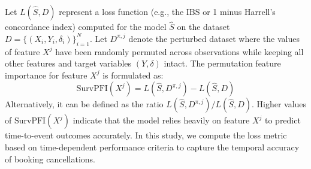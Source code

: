 \documentclass[pdflatex,sn-mathphys-ay]{sn-jnl}%
\theoremstyle{thmstyleone}%
\theoremstyle{thmstyletwo}%
\theoremstyle{thmstylethree}%
\begin{document}
Let $L(\hat{S}, D)$ represent a loss function (e.g., the IBS or 1 minus Harrell's concordance index) computed for the model $\hat{S}$ on the dataset $D = \{(X_i, Y_i, \delta_i)\}_{i=1}^N$. Let $D^{\pi, j}$ denote the perturbed dataset where the values of feature $X^j$ have been randomly permuted across observations while keeping all other features and target variables $(Y, \delta)$ intact. The permutation feature importance for feature $X^j$ is formulated as:
\begin{equation}
\text{SurvPFI}(X^j) = L(\hat{S}, D^{\pi, j}) - L(\hat{S}, D)
\end{equation}
Alternatively, it can be defined as the ratio $L(\hat{S}, D^{\pi, j}) / L(\hat{S}, D)$. Higher values of $\text{SurvPFI}(X^j)$ indicate that the model relies heavily on feature $X^j$ to predict time-to-event outcomes accurately. In this study, we compute the loss metric based on time-dependent performance criteria to capture the temporal accuracy of booking cancellations.
\end{document}
